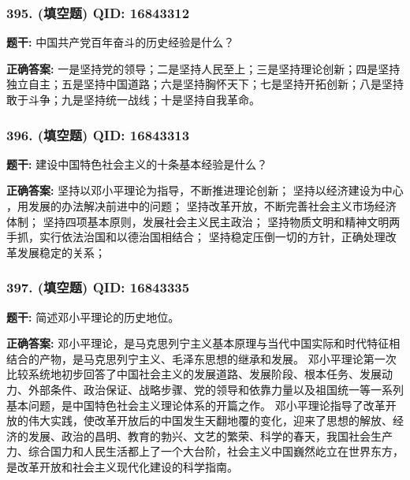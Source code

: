 \documentclass[12pt,UTF8]{ctexart}
\begin{document}
\vspace{0.3em}\hrulefill\vspace{0.7em}

\subsubsection*{395. (填空题) \small QID: 16843312}

\textbf{题干:}
中国共产党百年奋斗的历史经验是什么？

\textbf{正确答案:}
一是坚持党的领导；二是坚持人民至上；三是坚持理论创新；四是坚持独立自主；五是坚持中国道路；六是坚持胸怀天下；七是坚持开拓创新；八是坚持敢于斗争；九是坚持统一战线；十是坚持自我革命。

\vspace{0.3em}\hrulefill\vspace{0.7em}

\subsubsection*{396. (填空题) \small QID: 16843313}

\textbf{题干:}
建设中国特色社会主义的十条基本经验是什么？

\textbf{正确答案:}
坚持以邓小平理论为指导，不断推进理论创新；
坚持以经济建设为中心 ，用发展的办法解决前进中的问题；
坚持改革开放，不断完善社会主义市场经济体制；
坚持四项基本原则，发展社会主义民主政治；
坚持物质文明和精神文明两手抓，实行依法治国和以德治国相结合；
坚持稳定压倒一切的方针，正确处理改革发展稳定的关系；

\vspace{0.3em}\hrulefill\vspace{0.7em}

\subsubsection*{397. (填空题) \small QID: 16843335}

\textbf{题干:}
简述邓小平理论的历史地位。

\textbf{正确答案:}
邓小平理论，是马克思列宁主义基本原理与当代中国实际和时代特征相结合的产物，是马克思列宁主义、毛泽东思想的继承和发展。
邓小平理论第一次比较系统地初步回答了中国社会主义的发展道路、发展阶段、根本任务、发展动力、外部条件、政治保证、战略步骤、党的领导和依靠力量以及祖国统一等一系列基本问题，是中国特色社会主义理论体系的开篇之作。
邓小平理论指导了改革开放的伟大实践，使改革开放后的中国发生天翻地覆的变化，迎来了思想的解放、经济的发展、政治的昌明、教育的勃兴、文艺的繁荣、科学的春天，我国社会生产力、综合国力和人民生活都上了一个大台阶，社会主义中国巍然屹立在世界东方，是改革开放和社会主义现代化建设的科学指南。
\end{document}
